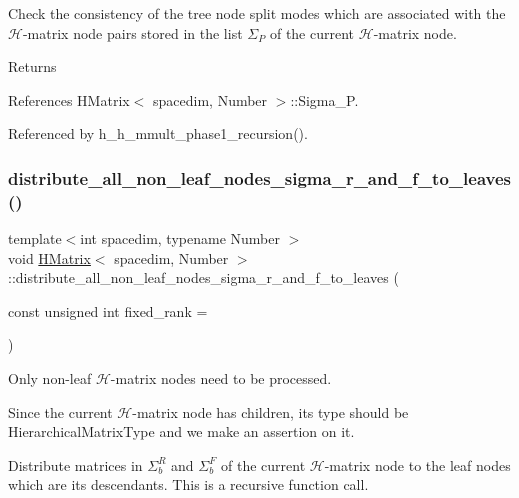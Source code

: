 Check the consistency of the tree node split modes which are associated with the $\mathcal{H}$-\/matrix node pairs stored in the list $\Sigma_P$ of the current $\mathcal{H}$-\/matrix node. \begin{DoxyReturn}{Returns}

\end{DoxyReturn}


References H\+Matrix$<$ spacedim, Number $>$\+::\+Sigma\+\_\+P.



Referenced by h\+\_\+h\+\_\+mmult\+\_\+phase1\+\_\+recursion().

\mbox{\label{classHMatrix_a66979dbdf56155c63f0706649e8545b9}} 
\subsubsection{\texorpdfstring{distribute\+\_\+all\+\_\+non\+\_\+leaf\+\_\+nodes\+\_\+sigma\+\_\+r\+\_\+and\+\_\+f\+\_\+to\+\_\+leaves()}{distribute\_all\_non\_leaf\_nodes\_sigma\_r\_and\_f\_to\_leaves()}}
{\footnotesize\ttfamily template$<$int spacedim, typename Number $>$ \\
void \hyperlink{classHMatrix}{H\+Matrix}$<$ spacedim, Number $>$\+::distribute\+\_\+all\+\_\+non\+\_\+leaf\+\_\+nodes\+\_\+sigma\+\_\+r\+\_\+and\+\_\+f\+\_\+to\+\_\+leaves (\begin{DoxyParamCaption}\item[{const unsigned int}]{fixed\+\_\+rank = {} }\end{DoxyParamCaption})\hspace{0.3cm}{\ttfamily [private]}}

Only non-\/leaf $\mathcal{H}$-\/matrix nodes need to be processed.

Since the current $\mathcal{H}$-\/matrix node has children, its type should be {\ttfamily Hierarchical\+Matrix\+Type} and we make an assertion on it.

Distribute matrices in $\Sigma_b^R$ and $\Sigma_b^F$ of the current $\mathcal{H}$-\/matrix node to the leaf nodes which are its descendants. This is a recursive function call.

